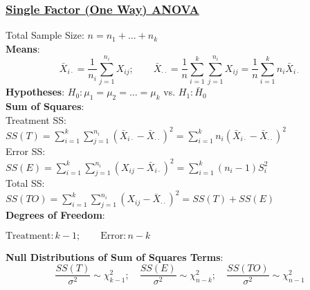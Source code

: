 \documentclass{article}
\begin{document}
\begin{multicols*}{2}
\subsubsection*{\underline{Single Factor (One Way) ANOVA}}
Total Sample Size: $n = n_{1} + \dots + n_{k}$\\
\textbf{Means}: $$\bar{X}_{i\cdot} = \frac{1}{n_{i}}\sum_{j=1}^{n_{i}} X_{ij}; \qquad \bar{X}_{\cdot \cdot} = \frac{1}{n}\sum_{i=1}^{k} \sum_{j=1}^{n_{i}} X_{ij} = \frac{1}{n}\sum_{i=1}^{k} n_{i}\bar{X}_{i\cdot}$$
\textbf{Hypotheses}: $H_{0}: \mu_{1} = \mu_{2} = \dots = \mu_{k}$ vs. $H_{1}: \bar{H}_{0}$\\
\textbf{Sum of Squares}:\\
Treatment SS:\\
$SS(T) = \sum_{i=1}^{k} \sum_{j=1}^{n_{i}} (\bar{X}_{i\cdot} - \bar{X}_{\cdot \cdot})^{2} = \sum_{i=1}^{k} n_{i} (\bar{X}_{i\cdot} - \bar{X}_{\cdot \cdot})^{2}$\\
Error SS:\\
$SS(E) = \sum_{i=1}^{k} \sum_{j=1}^{n_{i}} (X_{ij} - \bar{X}_{i\cdot})^{2} = \sum_{i=1}^{k} (n_{i} - 1) S_{i}^{2}$\\
Total SS:\\
$SS(TO) = \sum_{i=1}^{k} \sum_{j=1}^{n_{i}} (X_{ij} - \bar{X}_{\cdot \cdot})^{2} = SS(T) + SS(E)$\\
\textbf{Degrees of Freedom}:\\
\centerline{$\mbox{Treatment}: k-1; \qquad \mbox{Error}: n-k$}
\textbf{Null Distributions of Sum of Squares Terms}:
$$\frac{SS(T)}{\sigma^{2}} \sim \chi^{2}_{k-1}; \quad \frac{SS(E)}{\sigma^{2}} \sim \chi^{2}_{n-k}; \quad \frac{SS(TO)}{\sigma^{2}} \sim \chi^{2}_{n-1}$$


\end{multicols*}
\end{document}
